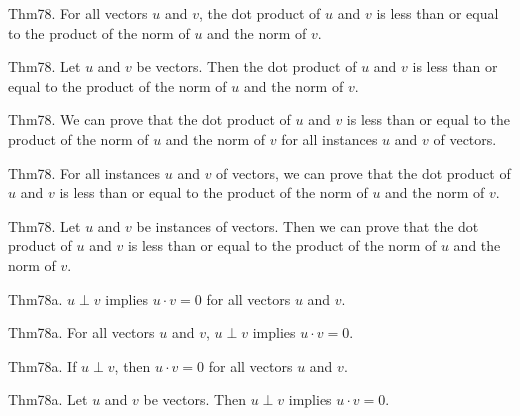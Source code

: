 \documentclass{article}
\begin{document}
Thm78. For all vectors $u$ and $v$, the dot product of $u$ and $v$ is less than or equal to the product of the norm of $u$ and the norm of $v$.

Thm78. Let $u$ and $v$ be vectors. Then the dot product of $u$ and $v$ is less than or equal to the product of the norm of $u$ and the norm of $v$.

Thm78. We can prove that the dot product of $u$ and $v$ is less than or equal to the product of the norm of $u$ and the norm of $v$ for all instances $u$ and $v$ of vectors.

Thm78. For all instances $u$ and $v$ of vectors, we can prove that the dot product of $u$ and $v$ is less than or equal to the product of the norm of $u$ and the norm of $v$.

Thm78. Let $u$ and $v$ be instances of vectors. Then we can prove that the dot product of $u$ and $v$ is less than or equal to the product of the norm of $u$ and the norm of $v$.

Thm78a. $u \perp v$ implies $u \cdot v = 0$ for all vectors $u$ and $v$.

Thm78a. For all vectors $u$ and $v$, $u \perp v$ implies $u \cdot v = 0$.

Thm78a. If $u \perp v$, then $u \cdot v = 0$ for all vectors $u$ and $v$.

Thm78a. Let $u$ and $v$ be vectors. Then $u \perp v$ implies $u \cdot v = 0$.
\end{document}
